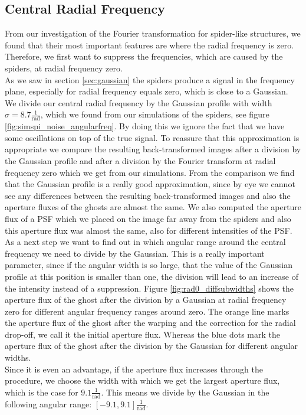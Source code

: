 \subsection{Central Radial Frequency}
\label{sec:central_radial_freq}
From our investigation of the Fourier transformation for spider-like structures, we found that their most important features are where the radial frequency is zero. Therefore, we first want to suppress the frequencies, which are caused by the spiders, at radial frequency zero.\\
As we saw in section \ref{sec:gaussian} the spiders produce a signal in the frequency plane, especially for radial frequency equals zero, which is close to a Gaussian. We divide our central radial frequency by the Gaussian profile with width $\sigma = 8.7 \frac{1}{\mathrm{rad}}$, which we found from our simulations of the spiders, see figure \ref{fig:simspi_noise_angularfreq}. By doing this we ignore the fact that we have some oscillations on top of the true signal. To reassure that this approximation is appropriate we compare the resulting back-transformed images after a division by the Gaussian profile and after a division by the Fourier transform at radial frequency zero which we get from our simulations. From the comparison we find that the Gaussian profile is a really good approximation, since by eye we cannot see any differences between the resulting back-transformed images and also the aperture fluxes of the ghosts are almost the same. We also computed the aperture flux of a PSF which we placed on the image far away from the spiders and also this aperture flux was almost the same, also for different intensities of the PSF.\\
As a next step we want to find out in which angular range around the central frequency we need to divide by the Gaussian. This is a really important parameter, since if the angular width is so large, that the value of the Gaussian profile at this position is smaller than one, the division will lead to an increase of the intensity instead of a suppression. Figure \ref{fig:rad0_diffsubwidths} shows the aperture flux of the ghost after the division by a Gaussian at radial frequency zero for different angular frequency ranges around zero. The orange line marks the aperture flux of the ghost after the warping and the correction for the radial drop-off, we call it the initial aperture flux. Whereas the blue dots mark the aperture flux of the ghost after the division by the Gaussian for different angular widths.\\
Since it is even an advantage, if the aperture flux increases through the procedure, we choose the width with which we get the largest aperture flux, which is the case for $9.1 \frac{1}{\mathrm{rad}}$. This means we divide by the Gaussian in the following angular range: $[-9.1, 9.1] \frac{1}{\mathrm{rad}}$.\\
